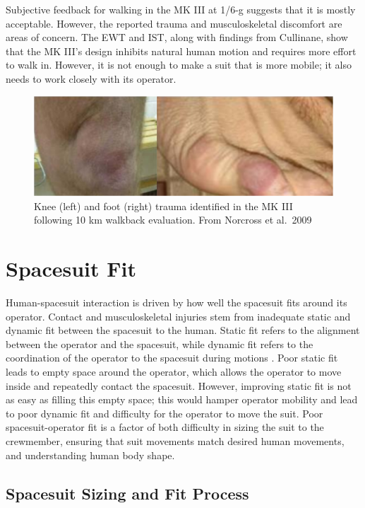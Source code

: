 \documentclass[defaultstyle,11pt]{comps}
\begin{document}
Subjective feedback for walking in the MK III at 1/6-g suggests that it is mostly acceptable.
However, the reported trauma and musculoskeletal discomfort are areas of concern.
The EWT and IST, along with findings from Cullinane, show that the MK III's design inhibits natural human motion and requires more effort to walk in.
However, it is not enough to make a suit that is more mobile; it also needs to work closely with its operator.

\begin{figure}
\hypertarget{fig:B-Trauma}{%
\centering
\includegraphics{../fig/Background/Trauma.png}
\caption{Knee (left) and foot (right) trauma identified in the MK III following 10 km walkback evaluation. From Norcross et al.~2009}\label{fig:B-Trauma}
}
\end{figure}

\hypertarget{spacesuit-fit}{%
\section{Spacesuit Fit}\label{spacesuit-fit}}

Human-spacesuit interaction is driven by how well the spacesuit fits around its operator.
Contact and musculoskeletal injuries stem from inadequate static and dynamic fit between the spacesuit to the human.
Static fit refers to the alignment between the operator and the spacesuit, while dynamic fit refers to the coordination of the operator to the spacesuit during motions \citep{Stirling2020}.
Poor static fit leads to empty space around the operator, which allows the operator to move inside and repeatedly contact the spacesuit.
However, improving static fit is not as easy as filling this empty space; this would hamper operator mobility and lead to poor dynamic fit and difficulty for the operator to move the suit.
Poor spacesuit-operator fit is a factor of both difficulty in sizing the suit to the crewmember, ensuring that suit movements match desired human movements, and understanding human body shape.

\hypertarget{spacesuit-sizing-and-fit-process}{%
\subsection{Spacesuit Sizing and Fit Process}\label{spacesuit-sizing-and-fit-process}}
\end{document}
